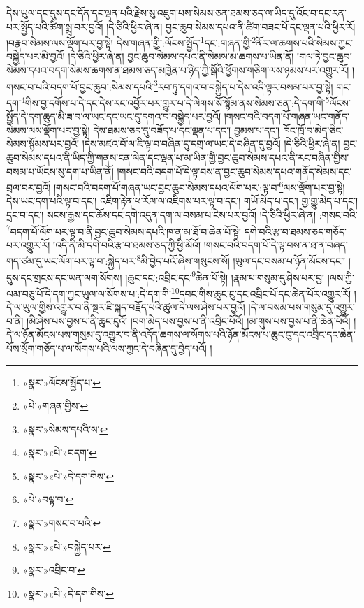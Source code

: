 དེས་ཡུལ་དང་དུས་དང་དོན་དང་ལྡན་པའི་རྗེས་སུ་འཇུག་པས་སེམས་ཅན་ཐམས་ཅད་ལ་ཡིད་དུ་འོང་བ་དང་རན་པར་སྤྱོད་པའི་ཚིག་སྨྲ་བར་བྱའོ། །དེ་ཅིའི་ཕྱིར་ཞེ་ན། བྱང་ཆུབ་སེམས་དཔའ་ནི་ཚིག་བཟང་པོ་དང་ལྡན་པའི་ཕྱིར་རོ། །བརྣབ་སེམས་ལས་ལྡོག་པར་བྱ་སྟེ། དེས་གཞན་གྱི་:ལོངས་སྤྱོད་\footnote{«སྣར་»ལོངས་སྤྱོད་པ་}དང་:གཞན་གྱི་\footnote{«པེ་»གཞན་གྱིས་}ནོར་ལ་ཆགས་པའི་སེམས་ཀྱང་བསྐྱེད་པར་མི་བྱའོ། །དེ་ཅིའི་ཕྱིར་ཞེ་ན། བྱང་ཆུབ་སེམས་དཔའ་ནི་སེམས་མ་ཆགས་པ་ཡིན་ནོ། །གལ་ཏེ་བྱང་ཆུབ་སེམས་དཔའ་བདག་སེམས་ཆགས་ན་ཐམས་ཅད་མཁྱེན་པ་ཉིད་ཀྱི་སྒོའི་ཕྱོགས་གཅིག་ལས་ཉམས་པར་འགྱུར་རོ། །གསང་བ་པའི་བདག་པོ་བྱང་ཆུབ་:སེམས་དཔའི་\footnote{«སྣར་»སེམས་དཔའི་ས་}རབ་ཏུ་དགའ་བ་བསྐྱེད་པ་དེས་འདི་ལྟར་བསམ་པར་བྱ་སྟེ། གང་དག་\footnote{«སྣར་»«པེ་»བདག་}གིས་བྱ་དགོས་པ་དེ་དང་དེས་རང་འབྱོར་པར་གྱུར་པ་དེ་ལེགས་སོ་སྙོམ་ནས་སེམས་ཅན་:དེ་དག་གི་\footnote{«སྣར་»«པེ་»དེ་དག་གིས་}ལོངས་སྤྱོད་དེ་དག་ཆུད་མི་ཟ་བ་ལ་ཡང་དང་ཡང་དུ་དགའ་བ་བསྐྱེད་པར་བྱའོ། །གསང་བའི་བདག་པོ་གཞན་ཡང་གནོད་སེམས་ལས་ལྡོག་པར་བྱ་སྟེ། དེས་ཐམས་ཅད་དུ་བཟོད་པ་དང་ལྡན་པ་དང་། བྱམས་པ་དང་། ཁོང་ཁྲོ་བ་མེད་ཅིང་སེམས་སྙོམས་པར་བྱའོ། །དེས་མཛའ་བོ་ལ་ཇི་ལྟ་བ་བཞིན་དུ་དགྲ་ལ་ཡང་དེ་བཞིན་དུ་བྱའོ། །དེ་ཅིའི་ཕྱིར་ཞེ་ན། བྱང་ཆུབ་སེམས་དཔའ་ནི་ཡིད་ཀྱི་གནས་ངན་ལེན་དང་ལྡན་པ་མ་ཡིན་གྱི་བྱང་ཆུབ་སེམས་དཔའ་ནི་རང་བཞིན་གྱིས་བསམ་པ་ཡོངས་སུ་དག་པ་ཡིན་ནོ། །གསང་བའི་བདག་པོ་དེ་ལྟ་བས་ན་བྱང་ཆུབ་སེམས་དཔའ་གནོད་སེམས་དང་བྲལ་བར་བྱའོ། །གསང་བའི་བདག་པོ་གཞན་ཡང་བྱང་ཆུབ་སེམས་དཔའ་ལོག་པར་:ལྟ་བ་\footnote{«པེ་»བལྟ་བ་}ལས་ལྡོག་པར་བྱ་སྟེ། དེས་ཡང་དག་པའི་ལྟ་བ་དང་། འཇིག་རྟེན་ཕ་རོལ་ལ་འཇིགས་པར་ལྟ་བ་དང་། གཡོ་མེད་པ་དང་། གྱ་གྱུ་མེད་པ་དང་། དྲང་བ་དང་། སངས་རྒྱས་དང་ཆོས་དང་དགེ་འདུན་དག་ལ་བསམ་པ་ངེས་པར་བྱའོ། །དེ་ཅིའི་ཕྱིར་ཞེ་ན། :གསང་བའི་\footnote{«སྣར་»གསང་བ་པའི་}བདག་པོ་ལོག་པར་ལྟ་བ་ནི་བྱང་ཆུབ་སེམས་དཔའི་ཁ་ན་མ་ཐོ་བ་ཆེན་པོ་སྟེ། དགེ་བའི་རྩ་བ་ཐམས་ཅད་གཅོད་པར་འགྱུར་རོ། །འདི་ནི་མི་དགེ་བའི་རྩ་བ་ཐམས་ཅད་ཀྱི་ཕྱི་མོའོ། །གསང་བའི་བདག་པོ་དེ་ལྟ་བས་ན་ཐ་ན་བཞད་གད་ཙམ་དུ་ཡང་ལོག་པར་ལྟ་བ་:སྐྱེད་པར་\footnote{«སྣར་»«པེ་»བསྐྱེད་པར་}མི་བྱེད་པའོ་ཞེས་གསུངས་སོ། །ཡུལ་དང་བསམ་པ་ཉོན་མོངས་དང་། །དུས་དང་གྲངས་དང་ཡན་ལག་སོགས། །ཆུང་དང་:འབྲིང་དང་\footnote{«སྣར་»འབྲིང་བ་}ཆེན་པོ་སྟེ། །རྣམ་པ་གསུམ་དུ་ཤེས་པར་བྱ། །ལས་ཀྱི་ལམ་བཅུ་པོ་དེ་དག་ཀྱང་ཡུལ་ལ་སོགས་པ་:དེ་དག་གི་\footnote{«སྣར་»«པེ་»དེ་དག་གིས་}དབང་གིས་ཆུང་ངུ་དང་འབྲིང་པོ་དང་ཆེན་པོར་འགྱུར་རོ། །དེ་ལ་ཡུལ་གྱིས་འགྱུར་བ་ནི་སྔར་ཇི་སྐད་བརྗོད་པའི་ཚུལ་དེ་ལས་ཤེས་པར་བྱའོ། །དེ་ལ་བསམ་པས་གསུམ་དུ་འགྱུར་བ་ནི། །མི་ཤེས་པས་བྱས་པ་ནི་ཆུང་ངུའོ། །བག་མེད་པས་བྱས་པ་ནི་འབྲིང་པོའོ། །མ་གུས་པས་བྱས་པ་ནི་ཆེན་པོའོ། །དེ་ལ་ཉོན་མོངས་པས་གསུམ་དུ་འགྱུར་བ་ནི་འདོད་ཆགས་ལ་སོགས་པའི་ཉོན་མོངས་པ་ཆུང་ངུ་དང་འབྲིང་དང་ཆེན་པོས་སྲོག་གཅོད་པ་ལ་སོགས་པའི་ལས་ཀྱང་དེ་བཞིན་དུ་བྱེད་པའོ། །
